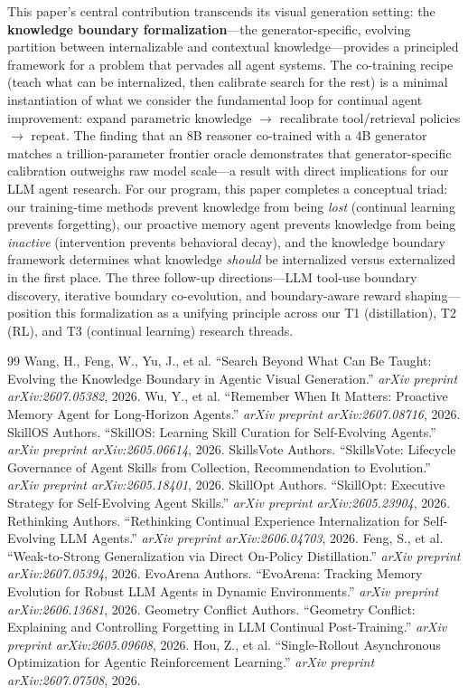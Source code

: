 \documentclass[11pt,a4paper]{article}
\begin{document}
This paper's central contribution transcends its visual generation setting: the \textbf{knowledge boundary formalization}---the generator-specific, evolving partition between internalizable and contextual knowledge---provides a principled framework for a problem that pervades all agent systems. The co-training recipe (teach what can be internalized, then calibrate search for the rest) is a minimal instantiation of what we consider the fundamental loop for continual agent improvement: expand parametric knowledge $\to$ recalibrate tool/retrieval policies $\to$ repeat. The finding that an 8B reasoner co-trained with a 4B generator matches a trillion-parameter frontier oracle demonstrates that generator-specific calibration outweighs raw model scale---a result with direct implications for our LLM agent research. For our program, this paper completes a conceptual triad: our training-time methods prevent knowledge from being \emph{lost} (continual learning prevents forgetting), our proactive memory agent prevents knowledge from being \emph{inactive} (intervention prevents behavioral decay), and the knowledge boundary framework determines what knowledge \emph{should} be internalized versus externalized in the first place. The three follow-up directions---LLM tool-use boundary discovery, iterative boundary co-evolution, and boundary-aware reward shaping---position this formalization as a unifying principle across our T1 (distillation), T2 (RL), and T3 (continual learning) research threads.

\begin{thebibliography}{99}
 Wang, H., Feng, W., Yu, J., et al. ``Search Beyond What Can Be Taught: Evolving the Knowledge Boundary in Agentic Visual Generation.'' \emph{arXiv preprint arXiv:2607.05382}, 2026.
 Wu, Y., et al. ``Remember When It Matters: Proactive Memory Agent for Long-Horizon Agents.'' \emph{arXiv preprint arXiv:2607.08716}, 2026.
 SkillOS Authors. ``SkillOS: Learning Skill Curation for Self-Evolving Agents.'' \emph{arXiv preprint arXiv:2605.06614}, 2026.
 SkillsVote Authors. ``SkillsVote: Lifecycle Governance of Agent Skills from Collection, Recommendation to Evolution.'' \emph{arXiv preprint arXiv:2605.18401}, 2026.
 SkillOpt Authors. ``SkillOpt: Executive Strategy for Self-Evolving Agent Skills.'' \emph{arXiv preprint arXiv:2605.23904}, 2026.
 Rethinking Authors. ``Rethinking Continual Experience Internalization for Self-Evolving LLM Agents.'' \emph{arXiv preprint arXiv:2606.04703}, 2026.
 Feng, S., et al. ``Weak-to-Strong Generalization via Direct On-Policy Distillation.'' \emph{arXiv preprint arXiv:2607.05394}, 2026.
 EvoArena Authors. ``EvoArena: Tracking Memory Evolution for Robust LLM Agents in Dynamic Environments.'' \emph{arXiv preprint arXiv:2606.13681}, 2026.
 Geometry Conflict Authors. ``Geometry Conflict: Explaining and Controlling Forgetting in LLM Continual Post-Training.'' \emph{arXiv preprint arXiv:2605.09608}, 2026.
 Hou, Z., et al. ``Single-Rollout Asynchronous Optimization for Agentic Reinforcement Learning.'' \emph{arXiv preprint arXiv:2607.07508}, 2026.
\end{thebibliography}
\end{document}
